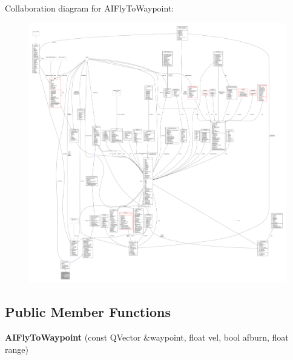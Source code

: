 Collaboration diagram for A\+I\+Fly\+To\+Waypoint\+:
\nopagebreak
\begin{figure}[H]
\begin{center}
\leavevmode
\includegraphics[width=350pt]{d9/d10/classAIFlyToWaypoint__coll__graph}
\end{center}
\end{figure}
\subsection*{Public Member Functions}
\begin{DoxyCompactItemize}
\item 
{\bfseries A\+I\+Fly\+To\+Waypoint} (const Q\+Vector \&waypoint, float vel, bool afburn, float range)\hypertarget{classAIFlyToWaypoint_a886b565a66116e743832129d613ad965}{}\label{classAIFlyToWaypoint_a886b565a66116e743832129d613ad965}

\end{DoxyCompactItemize}

